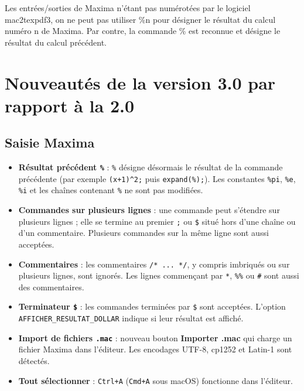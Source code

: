 \documentclass[a4paper, 11pt]{article}
\newcounter{num}
\begin{document}
Les entrées/sorties de Maxima n'étant pas numérotées par le logiciel mac2texpdf3, on ne peut pas utiliser \%n pour désigner le résultat du calcul numéro n de Maxima. Par contre, la commande \% est reconnue et désigne le résultat du calcul précédent.

\section*{Nouveautés de la version 3.0 par rapport à la 2.0}

\subsection*{Saisie Maxima}

\begin{itemize}

  \item \textbf{Résultat précédent \texttt{\%}} :
  \verb|%| désigne désormais le résultat de la commande
  précédente (par exemple \verb|(x+1)^2;| puis
  \verb|expand(%);|). Les constantes \verb|%pi|,
  \verb|%e|, \verb|%i| et les chaînes contenant \verb|%|
  ne sont pas modifiées.

  \item \textbf{Commandes sur plusieurs lignes} :
  une commande peut s'étendre sur plusieurs lignes ;
  elle se termine au premier \verb|;| ou \verb|$|
  situé hors d'une chaîne ou d'un commentaire.
  Plusieurs commandes sur la même ligne sont aussi acceptées.

  \item \textbf{Commentaires} :
  les commentaires \verb|/* ... */|, y compris imbriqués
  ou sur plusieurs lignes, sont ignorés.
  Les lignes commençant par \verb|*|, \verb|%%| ou
  \verb|#| sont aussi des commentaires.

  \item \textbf{Terminateur \texttt{\$}} :
  les commandes terminées par \verb|$| sont acceptées.
  L'option \verb|AFFICHER_RESULTAT_DOLLAR| indique
  si leur résultat est affiché.

  \item \textbf{Import de fichiers \texttt{.mac}} :
  nouveau bouton \textbf{Importer .mac} qui charge
  un fichier Maxima dans l'éditeur.
  Les encodages UTF-8, cp1252 et Latin-1 sont détectés.

  \item \textbf{Tout sélectionner} :
  \texttt{Ctrl+A} (\texttt{Cmd+A} sous macOS)
  fonctionne dans l'éditeur.

\end{itemize}
\end{document}

